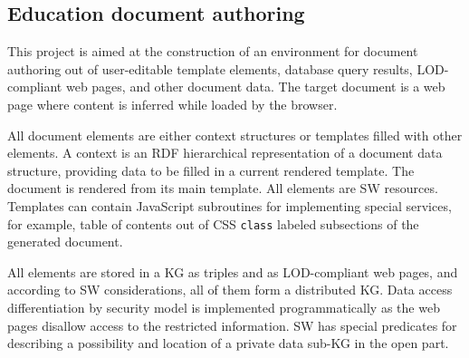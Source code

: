 \documentclass[
]{ceurart}
\begin{document}
\subsection{Education document authoring}
\label{sec:doc-impl}

This project \cite{authoring} is aimed at the construction of an environment for document authoring out of user-editable template elements, database query results, LOD-compliant web pages, and other document data.  The target document is a web page where content is inferred while loaded by the browser.

All document elements are either context structures or templates filled with other elements.  A context is an RDF hierarchical representation of a document data structure, providing data to be filled in a current rendered template.  The document is rendered from its main template.  All elements are SW resources.  Templates can contain JavaScript subroutines for implementing special services, for example, table of contents out of CSS \verb|class| labeled subsections of the generated document.

All elements are stored in a KG as triples and as LOD-compliant web pages, and according to SW considerations, all of them form a distributed KG.  Data access differentiation by security model is implemented programmatically as the web pages disallow access to the restricted information.  SW has special predicates for describing a possibility and location of a private data sub-KG in the open part.
\end{document}

